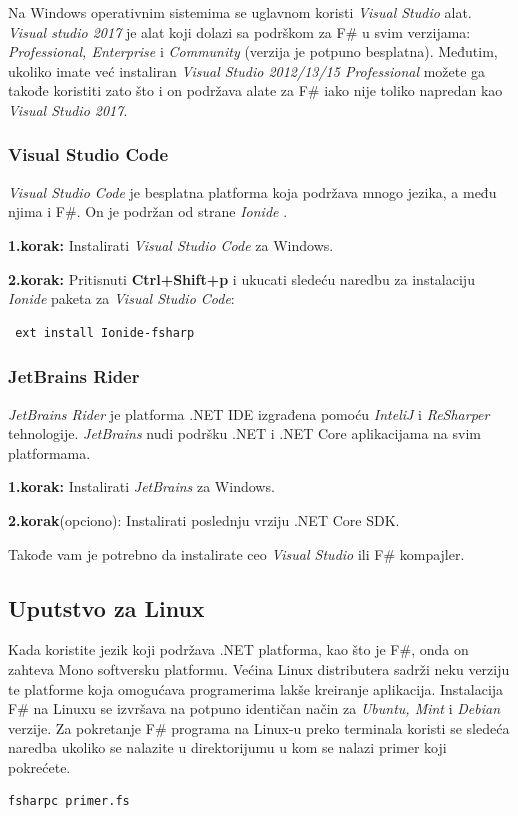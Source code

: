 \documentclass[a4paper]{article}
\begin{document}
Na Windows operativnim sistemima se uglavnom koristi {\em Visual Studio} alat. {\em Visual studio 2017} je alat koji dolazi sa podrškom za F\# u svim verzijama: {\em Professional, Enterprise} i {\em Community} (verzija je potpuno besplatna). Međutim, ukoliko imate  već instaliran {\em Visual Studio 2012/13/15  Professional} možete ga takođe koristiti zato što i on podržava alate za F\# iako nije toliko napredan kao {\em Visual Studio 2017}.

\subsubsection{Visual Studio Code}
	
{\em Visual Studio Code} je besplatna platforma koja podržava mnogo jezika, a među njima i F\#. On je podržan od strane {\em Ionide} \cite{ionide}.

\textbf{1.korak:} Instalirati {\em Visual Studio Code} za Windows.

\textbf{2.korak:} Pritisnuti \textbf{Ctrl+Shift+p} i ukucati sledeću naredbu za instalaciju {\em Ionide} paketa za {\em Visual Studio Code}:
\\
\begin{lstlisting}
 ext install Ionide-fsharp
\end{lstlisting}
 
\subsubsection{JetBrains Rider}

{\em JetBrains Rider} je platforma .NET IDE izgrađena pomoću {\em InteliJ} i {\em ReSharper} tehnologije. {\em JetBrains} nudi podršku .NET i .NET Core aplikacijama na svim platformama.

\textbf{1.korak:} Instalirati {\em JetBrains} za Windows.

\textbf{2.korak}(opciono): Instalirati poslednju vrziju .NET Core SDK.

Takođe vam je potrebno da instalirate ceo {\em Visual Studio} ili F\# kompajler.


\subsection{Uputstvo za Linux}

Kada koristite jezik koji podržava .NET platforma, kao što je F\#, onda on zahteva Mono \cite{mono} softversku platformu. Većina Linux distributera sadrži neku verziju te platforme koja omogućava programerima lakše kreiranje aplikacija. Instalacija F\# na Linuxu se izvršava na potpuno identičan način za {\em Ubuntu, Mint} i {\em Debian} verzije. Za pokretanje F\# programa na Linux-u preko terminala koristi se sledeća naredba ukoliko se nalazite u direktorijumu u kom se nalazi primer koji pokrećete.
\\
\begin{lstlisting}
fsharpc primer.fs
\end{lstlisting}
\end{document}
